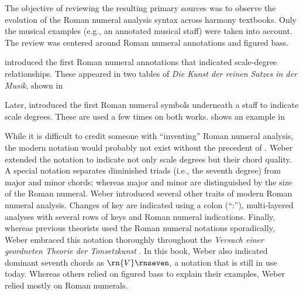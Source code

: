 The objective of reviewing the resulting primary sources was
to observe the evolution of the Roman numeral analysis
syntax across harmony textbooks. Only the musical examples
(e.g., an annotated musical staff) were taken into account.
The review was centered around Roman numeral annotations and
figured bass.

\textcite{kirnberger1774kunst} introduced the first Roman
numeral annotations that indicated scale-degree
relationships. These appeared in two tables of \emph{Die
Kunst der reinen Satzes in der Musik}, shown in


Later, \textcite{vogler1778grunde, vogler1802handbuch}
introduced the first Roman numeral symbols underneath a
staff to indicate scale degrees. These are used a few times
on both works. 
shows an example in \textcite{vogler1778grunde}


While it is difficult to credit someone with ``inventing''
Roman numeral analysis, the modern notation would probably
not exist without the precedent of
\textcite{weber1817versuch}. Weber extended the notation to
indicate not only scale degrees but their chord quality. A
special notation separates diminished triads (i.e., the
seventh degree) from major and minor chords; whereas major
and minor are distinguished by the size of the Roman
numeral. Weber introduced several other traits of modern
Roman numeral analysis. Changes of key are indicated using a
colon (``:''), multi-layered analyses with several rows of
keys and Roman numeral indications. Finally, whereas
previous theorists used the Roman numeral notations
sporadically, Weber embraced this notation thoroughly
throughout the \emph{Versuch einer geordneten Theorie der
Tonsetzkunst} \parencite{weber1817versuch}. In this book,
Weber also indicated dominant seventh chords as
$\rn{V}\rnseven$, a notation that is still in use today.
Whereas others relied on figured bass to explain their
examples, Weber relied mostly on Roman numerals.


